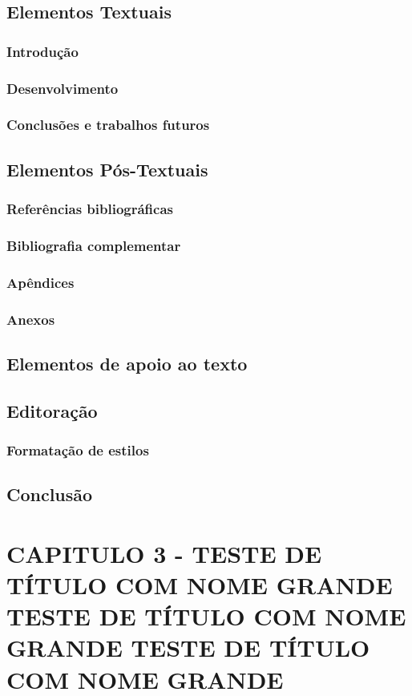 \documentclass[pnumromarab, normaltoc, a4paper, 12pt]{abnt-unochapeco}
\begin{document}
\section{Elementos Textuais}

\subsection{Introdução}
\subsection{Desenvolvimento}
\subsection{Conclusões e trabalhos futuros}
\section{Elementos Pós-Textuais}
\subsection{Referências bibliográficas}
\subsection{Bibliografia complementar}
\subsection{Apêndices}
\subsection{Anexos}
\section{Elementos de apoio ao texto}
\section{Editoração}
\subsection{Formatação de estilos}
\section{Conclusão}
\chapter{CAPITULO 3 - TESTE DE TÍTULO COM NOME GRANDE TESTE DE TÍTULO COM NOME
GRANDE TESTE DE TÍTULO COM NOME GRANDE}
\end{document}

